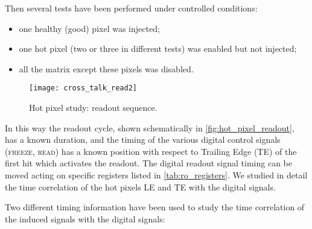Then several tests have been performed under controlled conditions:
\begin{itemize}
\item one healthy (good) pixel was injected;
\item one hot pixel (two or three in different tests) was enabled but not injected;
\item all the matrix except these pixels was disabled.%
\end{itemize}

\begin{figure}[h!]
\centering
\texttt{[image: cross\_talk\_read2]}
\caption{Hot pixel study: readout sequence.}
\label{fig:hot_pixel_readout}
\end{figure}


\begin{comment}
\begin{figure}[h!]
\centering
\texttt{[image: cross\_talk\_redout.jpg]}
\caption{Hot pixel study: readout sequence.}
\label{fig:hot_pixel_readout}
\end{figure}
\end{comment}

In this way the readout cycle, shown schematically in \autoref{fig:hot_pixel_readout}, has a known duration, and the timing of the various digital control signals (\textsc{freeze}, \textsc{read}) has a known position with respect to Trailing Edge (TE) of the first hit which activates the readout. The digital readout signal timing can be moved acting on specific registers listed in \autoref{tab:ro_registers}. We studied in detail the time correlation of the hot pixels LE and TE with the digital signals.

Two different timing information have been used to study the time correlation of the induced signals with the digital signals:

